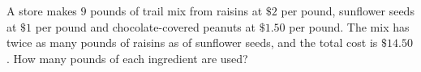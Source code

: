 A store makes $9$ pounds of trail mix from raisins at $\$2$ per pound, sunflower seeds at $\$1$ per pound and chocolate-covered peanuts at $\$1.50$ per pound. The mix has twice as many pounds of raisins as of sunflower seeds, and the total cost is $\$14.50$. How many pounds of each ingredient are used?
